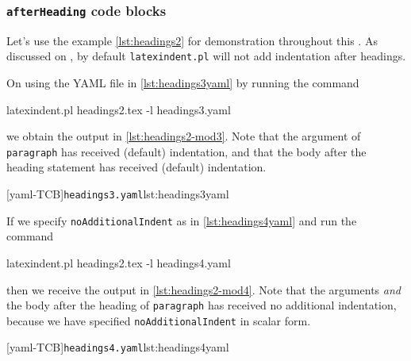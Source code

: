 \subsubsection{\texttt{afterHeading} code blocks}\label{subsubsec-headings-no-add-indent-rules}
	Let's use the example \cref{lst:headings2} for demonstration throughout this .
    As discussed on , by default \texttt{latexindent.pl} will not add indentation after headings.


    On using the YAML file in \cref{lst:headings3yaml} by running the command
    \begin{commandshell}
latexindent.pl headings2.tex -l headings3.yaml      
    \end{commandshell}
    we obtain the output in \cref{lst:headings2-mod3}. Note that the argument of \texttt{paragraph} has received (default) indentation, 
    and that the body after the heading statement has received (default) indentation.

	\begin{minipage}{.45\textwidth}
	\end{minipage}%
	\hfill
	\begin{minipage}{.45\textwidth}
		[yaml-TCB]{\texttt{headings3.yaml}}{lst:headings3yaml}
	\end{minipage}

    If we specify \texttt{noAdditionalIndent} as in \cref{lst:headings4yaml} and run the command
    \begin{commandshell}
latexindent.pl headings2.tex -l headings4.yaml      
    \end{commandshell}
    then we receive the output in \cref{lst:headings2-mod4}. Note that the arguments \emph{and} the body after the heading
    of \texttt{paragraph} has received no additional indentation, because we have specified \texttt{noAdditionalIndent} in scalar form.

	\begin{minipage}{.45\textwidth}
	\end{minipage}%
	\hfill
	\begin{minipage}{.45\textwidth}
		[yaml-TCB]{\texttt{headings4.yaml}}{lst:headings4yaml}
	\end{minipage}

